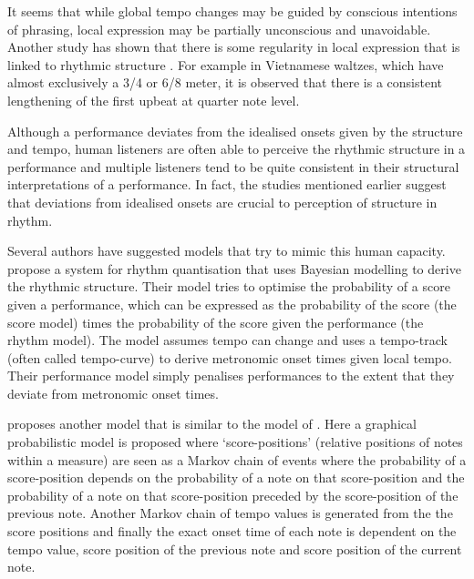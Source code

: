 It seems that while global tempo changes may be guided by conscious intentions of phrasing, local expression may be partially unconscious and unavoidable. Another study has shown that there is some regularity in local expression that is linked to rhythmic structure \citep{bengtsson1983analysis}. For example in Vietnamese waltzes, which have almost exclusively a 3/4 or 6/8 meter, it is observed that there is a consistent lengthening of the first upbeat at quarter note level.

Although a performance deviates from the idealised onsets given by the structure and tempo, human listeners are often able to perceive the rhythmic structure in a performance and multiple listeners tend to be quite consistent in their structural interpretations of a performance. In fact, the studies mentioned earlier suggest that deviations from idealised onsets are crucial to perception of structure in rhythm.


Several authors have suggested models that try to mimic this human capacity. \citet{cemgil2000rhythm} propose a system for rhythm quantisation that uses Bayesian modelling to derive the rhythmic structure. Their model tries to optimise the probability of a score given a performance, which can be expressed as the probability of the score (the score model) times the probability of the score given the performance (the rhythm model). The model assumes tempo can change and uses a tempo-track (often called tempo-curve) to derive metronomic onset times given local tempo. Their performance model simply penalises performances to the extent that they deviate from metronomic onset times. 

\citet{raphael2002hybrid} proposes another model that is similar to the model of \citet{cemgil2000rhythm}. Here a graphical probabilistic model is proposed where `score-positions' (relative positions of notes within a measure) are seen as a Markov chain of events where the probability of a score-position depends on the probability of a note on that score-position and the probability of a note on that score-position preceded by the score-position of the previous note. Another Markov chain of tempo values is generated from the the score positions and finally the exact onset time of each note is dependent on the tempo value, score position of the previous note and score position of the current note.

